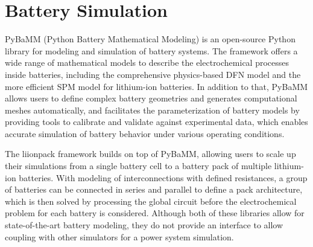 \section{Battery Simulation}
\label{battery_simulation}

PyBaMM \cite{pybammbatteries} (Python Battery Mathematical Modeling) is an open-source Python library for modeling and simulation of battery systems. The framework offers a wide range of mathematical models to describe the electrochemical processes inside batteries, including the comprehensive physics-based DFN model and the more efficient SPM model for lithium-ion batteries. In addition to that, PyBaMM allows users to define complex battery geometries and generates computational meshes automatically, and facilitates the parameterization of battery models by providing tools to calibrate and validate against experimental data, which enables accurate simulation of battery behavior under various operating conditions. 

The liionpack framework \cite{tranter2022liionpack} builds on top of PyBaMM, allowing users to scale up their simulations from a single battery cell to a battery pack of multiple lithium-ion batteries. With modeling of interconnections with defined resistances, a group of batteries can be connected in series and parallel to define a pack architecture, which is then solved by processing the global circuit before the electrochemical problem for each battery is considered. Although both of these libraries allow for state-of-the-art battery modeling, they do not provide an interface to allow coupling with other simulators for a power system simulation.
